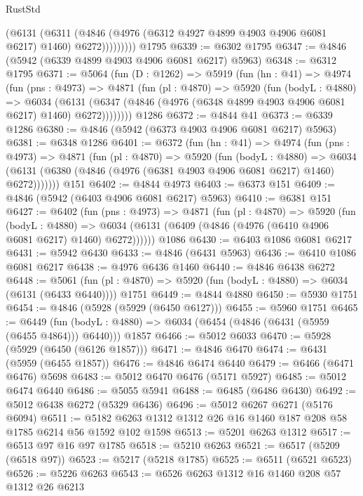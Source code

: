 \begin{lexlean}{RustStd}
\begin{coremodule}
                (@6131
                  (@6311
                    (@4846 (@4976 (@6312 @4927 @4899 @4903 @4906 @6081 @6217) @1460) @6272)))))))))
    @1795
@6339 := @6302 @1795
@6347 := @4846 (@5942 (@6339 @4899 @4903 @4906 @6081 @6217) @5963)
@6348 := @6312 @1795
@6371 := @5064
    (fun (D : @1262) =>
    @5919
      (fun (hn : @41) =>
      @4974
        (fun (pns : @4973) =>
        @4871
          (fun (pl : @4870) =>
          @5920
            (fun (bodyL : @4880) =>
            @6034
              (@6131 (@6347 (@4846 (@4976 (@6348 @4899 @4903 @4906 @6081 @6217) @1460) @6272))))))))
    @1286
@6372 := @4844 @41
@6373 := @6339 @1286
@6380 := @4846 (@5942 (@6373 @4903 @4906 @6081 @6217) @5963)
@6381 := @6348 @1286
@6401 := @6372
    (fun (hn : @41) =>
    @4974
      (fun (pns : @4973) =>
      @4871
        (fun (pl : @4870) =>
        @5920
          (fun (bodyL : @4880) =>
          @6034 (@6131 (@6380 (@4846 (@4976 (@6381 @4903 @4906 @6081 @6217) @1460) @6272)))))))
    @151
@6402 := @4844 @4973
@6403 := @6373 @151
@6409 := @4846 (@5942 (@6403 @4906 @6081 @6217) @5963)
@6410 := @6381 @151
@6427 := @6402
    (fun (pns : @4973) =>
    @4871
      (fun (pl : @4870) =>
      @5920
        (fun (bodyL : @4880) =>
        @6034 (@6131 (@6409 (@4846 (@4976 (@6410 @4906 @6081 @6217) @1460) @6272))))))
    @1086
@6430 := @6403 @1086 @6081 @6217
@6431 := @5942 @6430
@6433 := @4846 (@6431 @5963)
@6436 := @6410 @1086 @6081 @6217
@6438 := @4976 @6436 @1460
@6440 := @4846 @6438 @6272
@6448 := @5061
    (fun (pl : @4870) => @5920 (fun (bodyL : @4880) => @6034 (@6131 (@6433 @6440))))
    @1751
@6449 := @4844 @4880
@6450 := @5930 @1751
@6454 := @4846 (@5928 (@5929 (@6450 @6127)))
@6455 := @5960 @1751
@6465 := @6449
    (fun (bodyL : @4880) => @6034 (@6454 (@4846 (@6431 (@5959 (@6455 @4864))) @6440)))
    @1857
@6466 := @5012 @6033
@6470 := @5928 (@5929 (@6450 (@6126 @1857)))
@6471 := @4846 @6470
@6474 := @6431 (@5959 (@6455 @1857))
@6476 := @4846 @6474 @6440
@6479 := @6466 (@6471 @6476) @5698
@6483 := @5012 @6470 @6476 (@5171 @5927)
@6485 := @5012 @6474 @6440
@6486 := @5055 @5941
@6488 := @6485 (@6486 @6430)
@6492 := @5012 @6438 @6272 (@5329 @6436)
@6496 := @5012 @6267 @6271 (@5176 @6094)
@6511 := @5182 @6263 @1312 @1312 @26 @16 @1460 @187 @208 @58 @1785 @6214 @56 @1592 @102 @1598
@6513 := @5201 @6263 @1312
@6517 := @6513 @97 @16 @97 @1785
@6518 := @5210 @6263
@6521 := @6517 (@5209 (@6518 @97))
@6523 := @5217 (@5218 @1785)
@6525 := @6511 (@6521 @6523)
@6526 := @5226 @6263
@6543 := @6526
    @6263
    @1312
    @16
    @1460
    @208
    @57
    @1312
    @26
    @6213

\end{coremodule}
\end{lexlean}
